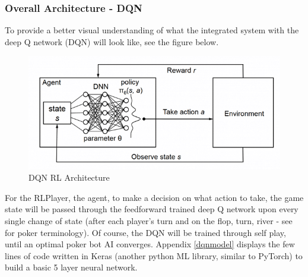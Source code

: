 \documentclass[12pt]{article}
\begin{document}
\subsubsection{Overall Architecture - DQN}
To provide a better visual understanding of what the integrated system with the deep Q network (DQN) will look like, see the figure below.
\begin{figure}[H]
    \centering
    \includegraphics[width=.80\linewidth]{figures/qsys}
    \caption{DQN RL Architecture \cite{qsys}}
    \label{fig:q}
\end{figure}
For the RLPlayer, the agent, to make a decision on what action to take, the game state will be passed through the feedforward trained deep Q network upon every single change of state (after each player's turn and on the flop, turn, river - see \cite{gloss} for poker terminology). Of course, the DQN will be trained through self play, until an optimal poker bot AI converges. Appendix \ref{dqnmodel} displays the few lines of code written in Keras (another python ML library, similar to PyTorch) to build a basic 5 layer neural network.
\end{document}
